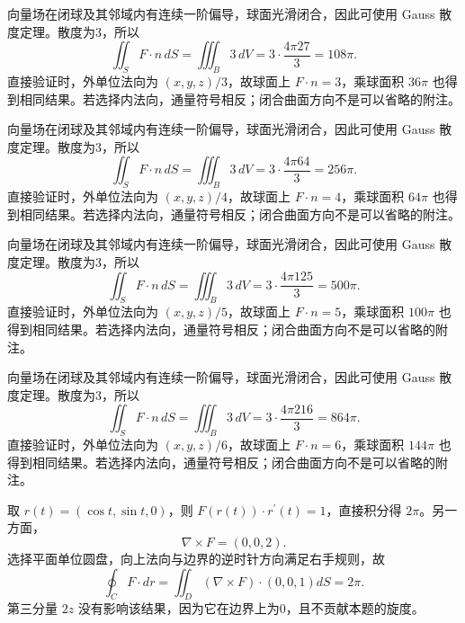 \documentclass[UTF8,12pt,a4paper,fontset=fandol]{ctexart}
\begin{document}
\begin{solve}\label{ans:c43q15}
向量场在闭球及其邻域内有连续一阶偏导，球面光滑闭合，因此可使用 Gauss 散度定理。散度为3，所以
\[
\iint_SF\cdot n\,dS=\iiint_B3\,dV=3\cdot\frac{4\pi27}3=108\pi.
\]
直接验证时，外单位法向为 $(x,y,z)/3$，故球面上 $F\cdot n=3$，乘球面积 $36\pi$ 也得到相同结果。若选择内法向，通量符号相反；闭合曲面方向不是可以省略的附注。
\end{solve}

\begin{solve}\label{ans:c43q16}
向量场在闭球及其邻域内有连续一阶偏导，球面光滑闭合，因此可使用 Gauss 散度定理。散度为3，所以
\[
\iint_SF\cdot n\,dS=\iiint_B3\,dV=3\cdot\frac{4\pi64}3=256\pi.
\]
直接验证时，外单位法向为 $(x,y,z)/4$，故球面上 $F\cdot n=4$，乘球面积 $64\pi$ 也得到相同结果。若选择内法向，通量符号相反；闭合曲面方向不是可以省略的附注。
\end{solve}

\begin{solve}\label{ans:c43q17}
向量场在闭球及其邻域内有连续一阶偏导，球面光滑闭合，因此可使用 Gauss 散度定理。散度为3，所以
\[
\iint_SF\cdot n\,dS=\iiint_B3\,dV=3\cdot\frac{4\pi125}3=500\pi.
\]
直接验证时，外单位法向为 $(x,y,z)/5$，故球面上 $F\cdot n=5$，乘球面积 $100\pi$ 也得到相同结果。若选择内法向，通量符号相反；闭合曲面方向不是可以省略的附注。
\end{solve}

\begin{solve}\label{ans:c43q18}
向量场在闭球及其邻域内有连续一阶偏导，球面光滑闭合，因此可使用 Gauss 散度定理。散度为3，所以
\[
\iint_SF\cdot n\,dS=\iiint_B3\,dV=3\cdot\frac{4\pi216}3=864\pi.
\]
直接验证时，外单位法向为 $(x,y,z)/6$，故球面上 $F\cdot n=6$，乘球面积 $144\pi$ 也得到相同结果。若选择内法向，通量符号相反；闭合曲面方向不是可以省略的附注。
\end{solve}

\begin{solve}\label{ans:c43q19}
取 $r(t)=(\cos t,\sin t,0)$，则 $F(r(t))\cdot r^{\prime}(t)=1$，直接积分得 $2\pi$。另一方面，
\[
\nabla\times F=(0,0,2).
\]
选择平面单位圆盘，向上法向与边界的逆时针方向满足右手规则，故
\[
\oint_C F\cdot dr=\iint_D(\nabla\times F)\cdot(0,0,1)dS=2\pi.
\]
第三分量 $2z$ 没有影响该结果，因为它在边界上为0，且不贡献本题的旋度。
\end{solve}
\end{document}
